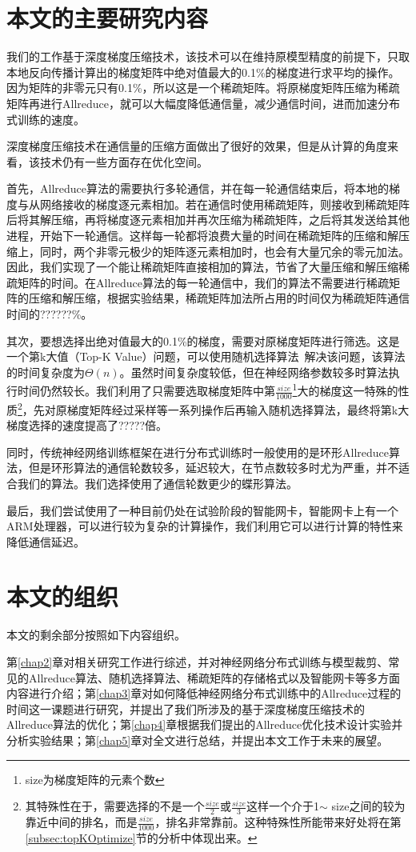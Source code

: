 \section{本文的主要研究内容}
我们的工作基于深度梯度压缩技术，该技术可以在维持原模型精度的前提下，只取本地反向传播计算出的梯度矩阵中绝对值最大的0.1\%的梯度进行求平均的操作。因为矩阵的非零元只有0.1\%，所以这是一个稀疏矩阵。将原梯度矩阵压缩为稀疏矩阵再进行Allreduce，就可以大幅度降低通信量，减少通信时间，进而加速分布式训练的速度。

深度梯度压缩技术在通信量的压缩方面做出了很好的效果，但是从计算的角度来看，该技术仍有一些方面存在优化空间。

首先，Allreduce算法的需要执行多轮通信，并在每一轮通信结束后，将本地的梯度与从网络接收的梯度逐元素相加。若在通信时使用稀疏矩阵，则接收到稀疏矩阵后将其解压缩，再将梯度逐元素相加并再次压缩为稀疏矩阵，之后将其发送给其他进程，开始下一轮通信。这样每一轮都将浪费大量的时间在稀疏矩阵的压缩和解压缩上，同时，两个非零元极少的矩阵逐元素相加时，也会有大量冗余的零元加法。因此，我们实现了一个能让稀疏矩阵直接相加的算法，节省了大量压缩和解压缩稀疏矩阵的时间。在Allreduce算法的每一轮通信中，我们的算法不需要进行稀疏矩阵的压缩和解压缩，根据实验结果，稀疏矩阵加法所占用的时间仅为稀疏矩阵通信时间的??????\%。

其次，要想选择出绝对值最大的0.1\%的梯度，需要对原梯度矩阵进行筛选。这是一个第k大值（Top-K Value）问题，可以使用随机选择算法~\cite{IntroToAlgo}解决该问题，该算法的时间复杂度为$\Theta(n)$。虽然时间复杂度较低，但在神经网络参数较多时算法执行时间仍然较长。我们利用了只需要选取梯度矩阵中第$\frac{size}{1000}$\footnote{size为梯度矩阵的元素个数}大的梯度这一特殊的性质\footnote{其特殊性在于，需要选择的不是一个$\frac{size}{2}$或$\frac{size}{3}$这样一个介于1$\sim$ size之间的较为靠近中间的排名，而是$\frac{size}{1000}$，排名非常靠前。这种特殊性所能带来好处将在第\ref{subsec:topKOptimize}节的分析中体现出来。}，先对原梯度矩阵经过采样等一系列操作后再输入随机选择算法，最终将第k大梯度选择的速度提高了?????倍。

同时，传统神经网络训练框架在进行分布式训练时一般使用的是环形Allreduce算法，但是环形算法的通信轮数较多，延迟较大，在节点数较多时尤为严重，并不适合我们的算法。我们选择使用了通信轮数更少的蝶形算法。

最后，我们尝试使用了一种目前仍处在试验阶段的智能网卡，智能网卡上有一个ARM处理器，可以进行较为复杂的计算操作，我们利用它可以进行计算的特性来降低通信延迟。

\section{本文的组织}

本文的剩余部分按照如下内容组织。

第\ref{chap2}章对相关研究工作进行综述，并对神经网络分布式训练与模型裁剪、常见的Allreduce算法、随机选择算法、稀疏矩阵的存储格式以及智能网卡等多方面内容进行介绍；第\ref{chap3}章对如何降低神经网络分布式训练中的Allreduce过程的时间这一课题进行研究，并提出了我们所涉及的基于深度梯度压缩技术的Allreduce算法的优化；第\ref{chap4}章根据我们提出的Allreduce优化技术设计实验并分析实验结果；第\ref{chap5}章对全文进行总结，并提出本文工作于未来的展望。